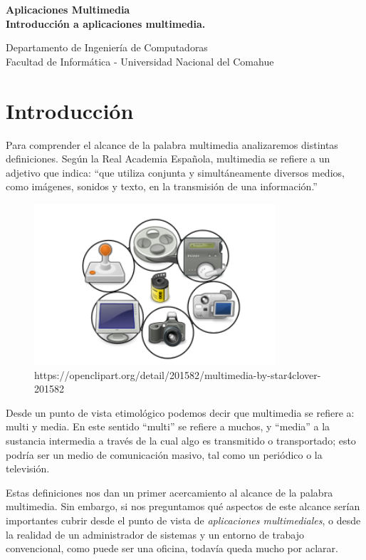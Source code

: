 \documentclass[12pt]{article}
\def\maketitle{

 \makeatletter
 {\color{bl} \centering \huge \sc \textbf{
  Aplicaciones Multimedia\\ 
\large \vspace*{-8pt} \color{black}Introducción a aplicaciones multimedia. 
 \vspace*{8pt} }\par}
 \makeatother

\makeatletter
 {\centering \small 
 	Departamento de Ingeniería de Computadoras \\
 	Facultad de Informática - Universidad Nacional del Comahue \\
 	\vspace{20pt} }
 \makeatother

}
\begin{document}
\thispagestyle{empty}
\maketitle
\setlength{\parindent}{0pt}

\section*{Introducción}

Para comprender el alcance de la palabra multimedia analizaremos distintas 
definiciones. Según la Real Academia Española, multimedia se refiere a un 
adjetivo que indica: ``que utiliza conjunta y simultáneamente diversos 
medios, como imágenes, sonidos y texto, en la transmisión de una 
información.''\cite{raemm}


\begin{figure}[h]
\centering
\includegraphics[width=0.8\textwidth]{multimedia.png}
\renewcommand{\figurename}{Fig.}
\caption{https://openclipart.org/detail/201582/multimedia-by-star4clover-201582}
\label{contexto:figura}
\end{figure}

Desde un punto de vista etimológico podemos decir que multimedia se 
refiere a: multi y media. En este sentido ``multi'' se refiere a  muchos, y ``media'' a la
sustancia intermedia a través de la cual algo es transmitido o 
transportado; esto podría ser un medio de comunicación masivo, tal como un periódico o 
la televisión.\cite{ramyer}

Estas definiciones nos dan un primer acercamiento al alcance de la palabra
multimedia. Sin embargo, si nos preguntamos qué aspectos de este alcance 
serían importantes cubrir desde el punto de vista de {\it aplicaciones 
multimediales}, o desde la realidad de un administrador de sistemas y un 
entorno de trabajo convencional, como puede ser una oficina, todavía queda
mucho por aclarar. 
\end{document}
